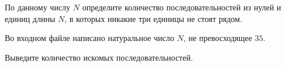 

По данному числу $N$ определите количество последовательностей из нулей и единиц длины $N$, в которых никакие три единицы не стоят рядом.

\InputFile
Во входном файле написано натуральное число $N$, не превосходящее $35$.

\OutputFile
Выведите количество искомых последовательностей. 



